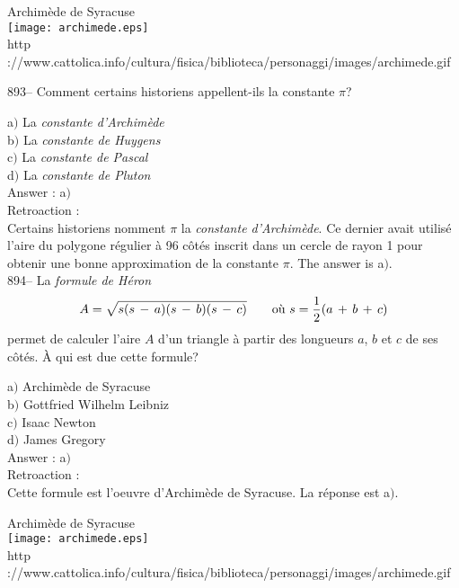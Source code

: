 ﻿\documentclass[letterpaper, 12pt]{article}
\begin{document}
        \begin{center}
        Archim\`ede de Syracuse\\
    \texttt{[image: archimede.eps]}\\
        {\footnotesize http
://www.cattolica.info/cultura/fisica/biblioteca/personaggi/images/archimede.gif}
    \end{center}

893-- Comment certains historiens appellent-ils la constante $\pi$?

a$)$ La {\sl constante d'Archim\`ede} \\
b$)$ La {\sl constante de Huygens} \\
c$)$ La {\sl constante de Pascal} \\
d$)$ La {\sl constante de Pluton} \\

Answer : a$)$\\

Retroaction : \\
Certains historiens nomment $\pi$ la {\sl constante d'Archim\`ede}.
Ce dernier avait utilis\'e l'aire du polygone r\'egulier
\`a 96 c\^ot\'es inscrit dans un cercle de rayon 1 pour obtenir une bonne
approximation de la constante $\pi$. The answer is a$)$.\\

894-- La {\sl formule de H\'eron}
$$A=\sqrt{s(s\,-\,a)(s\,-\,b)(s\,-\,c)}\hskip 20 pt \text{o\`u }
s=\displaystyle\frac12(a\,+\,b\,+\,c)$$
permet de calculer l'aire $A$ d'un triangle \`a partir des longueurs
$a$, $b$ et $c$ de ses c\^ot\'es. \`A qui est due cette formule?

a$)$ Archim\`ede de Syracuse \\
b$)$ Gottfried Wilhelm Leibniz \\
c$)$ Isaac Newton \\
d$)$ James Gregory \\

Answer : a$)$\\

Retroaction : \\
Cette formule est l'oeuvre d'Archim\`ede de Syracuse. La r\'eponse
est a$)$.

        \begin{center}
        Archim\`ede de Syracuse\\
    \texttt{[image: archimede.eps]}\\
        {\footnotesize http
://www.cattolica.info/cultura/fisica/biblioteca/personaggi/images/archimede.gif}
    \end{center}
\end{document}
